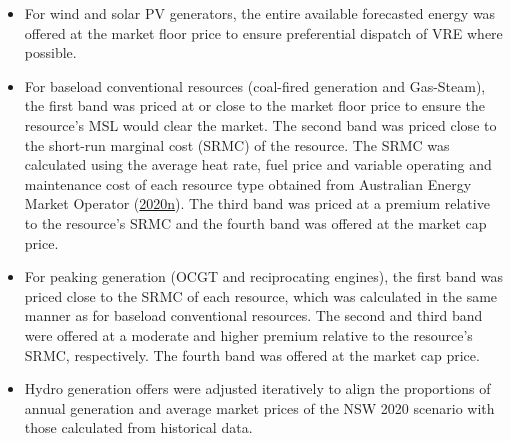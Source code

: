 \documentclass[12pt,a4paper,]{report}
\providecommand{\tightlist}{%
  \setlength{\itemsep}{0pt}\setlength{\parskip}{0pt}}
\begin{document}
\begin{itemize}
\tightlist
\item
  For wind and solar PV generators, the entire available forecasted
  energy was offered at the market floor price to ensure preferential
  dispatch of VRE where possible.
\item
  For baseload conventional resources (coal-fired generation and
  Gas-Steam), the first band was priced at or close to the market floor
  price to ensure the resource's MSL would clear the market. The second
  band was priced close to the short-run marginal cost (SRMC) of the
  resource. The SRMC was calculated using the average heat rate, fuel
  price and variable operating and maintenance cost of each resource
  type obtained from Australian Energy Market Operator
  (\protect\hyperlink{ref-australianenergymarketoperator2020InputsAssumptions2020}{2020n}).
  The third band was priced at a premium relative to the resource's SRMC
  and the fourth band was offered at the market cap price.
\item
  For peaking generation (OCGT and reciprocating engines), the first
  band was priced close to the SRMC of each resource, which was
  calculated in the same manner as for baseload conventional resources.
  The second and third band were offered at a moderate and higher
  premium relative to the resource's SRMC, respectively. The fourth band
  was offered at the market cap price.
\item
  Hydro generation offers were adjusted iteratively to align the
  proportions of annual generation and average market prices of the NSW
  2020 scenario with those calculated from historical data.
\end{itemize}

\def\pandoctableshortcapt{Offers by resource type for NSW and SA across
all scenarios}
\end{document}
